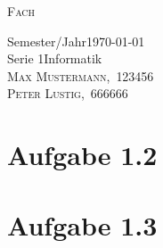 \documentclass[a4paper, fontsize=10pt]{scrartcl}
\newcommand{\header}[1]{\begin{center}\Huge\textsc{{\color{uzl-blue}#1}}\end{center}}
\newcommand{\semester}[1]{#1\hfill\today\\[0.2 cm]}
\newcommand{\topic}[2]{\Large{\color{uzl-orange}#1\hfill\large#2}\\[0.2cm] }
\newcommand{\student}[2]{\small{\textsc{#1},~\textsc{#2}}}
\begin{document}
\header{Fach}
\semester{Semester/Jahr}
\topic{Serie 1}{Informatik}
\student{Max Mustermann}{123456} \\
\student{Peter Lustig}{666666}

	\section*{Aufgabe 1.2}

	\section*{Aufgabe 1.3}
\end{document}
